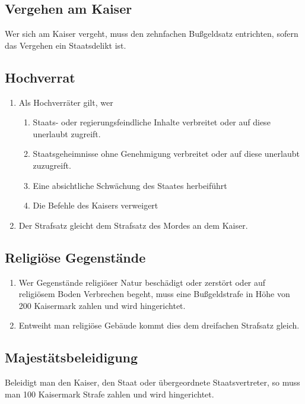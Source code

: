 \documentclass{article}
\begin{document}
\subsection{Vergehen am Kaiser}
Wer sich am Kaiser vergeht, muss den zehnfachen Bußgeldsatz entrichten, sofern das Vergehen ein Staatsdelikt ist.


\subsection{Hochverrat}
\begin{enumerate}[(1)]
    \item Als Hochverräter gilt, wer
    \begin{enumerate}[1.]
        \item Staats- oder regierungsfeindliche Inhalte verbreitet oder auf diese unerlaubt zugreift.
        \item Staatsgeheimnisse ohne Genehmigung verbreitet oder auf diese unerlaubt zuzugreift.
        \item Eine absichtliche Schwächung des Staates herbeiführt
        \item Die Befehle des Kaisers verweigert
    \end{enumerate}
    \item Der Strafsatz gleicht dem Strafsatz des Mordes an dem Kaiser.
\end{enumerate}

\subsection{Religiöse Gegenstände}
\begin{enumerate}[(1)]
    \item Wer Gegenstände religiöser Natur beschädigt oder zerstört oder auf religiösem Boden Verbrechen begeht, muss eine Bußgeldstrafe in Höhe von 200 Kaisermark zahlen und wird hingerichtet.
    \item Entweiht man religiöse Gebäude kommt dies dem dreifachen Strafsatz gleich.
\end{enumerate}

\subsection{Majestätsbeleidigung}
Beleidigt man den Kaiser, den Staat oder übergeordnete Staatsvertreter, so muss man 100 Kaisermark Strafe zahlen und wird hingerichtet.
\end{document}
